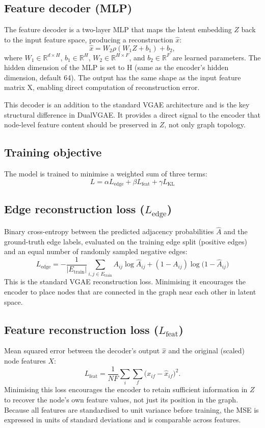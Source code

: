 \documentclass[11pt]{article}
\begin{document}
\subsection{Feature decoder (MLP)}

The feature decoder is a two-layer MLP that maps the latent embedding
$Z$ back to the input feature space, producing a reconstruction
$\hat{x}$:
\[ \hat{x} = W_2 \rho(W_1 Z + b_1) + b_2, \]
where $W_1 \in \mathbb{R}^{d \times H}$, $b_1 \in \mathbb{R}^H$,
$W_2 \in \mathbb{R}^{H \times F}$, and $b_2 \in \mathbb{R}^F$ are
learned parameters. The hidden dimension of the MLP is set to H (same
as the encoder's hidden dimension, default 64). The output has the
same shape as the input feature matrix X, enabling direct computation
of reconstruction error.

This decoder is an addition to the standard VGAE architecture and is
the key structural difference in DualVGAE. It provides a direct signal
to the encoder that node-level feature content should be preserved in
$Z$, not only graph topology.


\subsection{Training objective}
The model is trained to minimise a weighted sum of three terms:
\[
L = \alpha L_{\text{edge}} + \beta L_{\text{feat}} + \gamma
L_{\text{KL}}
\]


\subsection{Edge reconstruction loss ($L_{\text{edge}}$)}
Binary cross-entropy between the predicted adjacency probabilities
$\hat{A}$ and the ground-truth edge labels, evaluated on the
training edge split (positive edges) and an equal number of
randomly sampled negative edges:
\[
L_{\text{edge}} = -\frac{1}{\lvert E_{\text{train}} \rvert}
\sum_{i, j \in E_{\text{train}}} A_{ij} \log \hat{A}_{ij} +
(1 - A_{ij}) \log\big( 1 - \hat{A}_{ij} \big)
\]
This is the standard VGAE reconstruction loss. Minimising it
encourages the encoder to place nodes that are connected in the graph
near each other in latent space.


\subsection{Feature reconstruction loss ($L_{\text{feat}}$)}
Mean squared error between the decoder's output $\hat{x}$ and the
original (scaled) node features $X$:
\[
L_{\text{feat}} = \frac{1}{N F} \sum_i \sum_f
\big( x_{if} - \hat{x}_{if} \big)^2.
\]
Minimising this loss encourages the encoder to retain sufficient
information in $Z$ to recover the node's own feature values, not just
its position in the graph. Because all features are standardised to
unit variance before training, the MSE is expressed in units of
standard deviations and is comparable across features.
\end{document}
